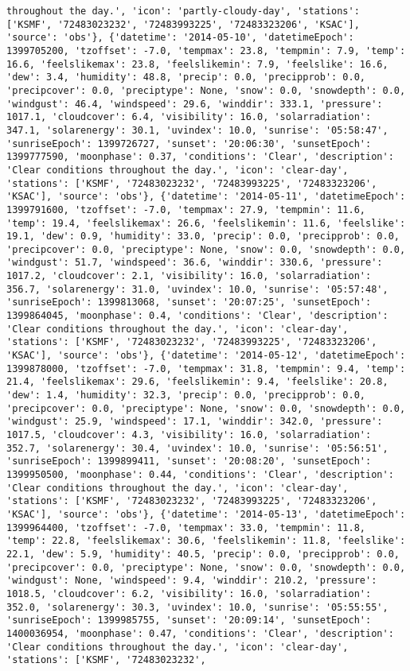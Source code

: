\documentclass[
  letterpaper,
  DIV=11,
  numbers=noendperiod]{scrartcl}
\begin{document}
\begin{verbatim}
throughout the day.', 'icon': 'partly-cloudy-day', 'stations': ['KSMF', '72483023232', '72483993225', '72483323206', 'KSAC'], 'source': 'obs'}, {'datetime': '2014-05-10', 'datetimeEpoch': 1399705200, 'tzoffset': -7.0, 'tempmax': 23.8, 'tempmin': 7.9, 'temp': 16.6, 'feelslikemax': 23.8, 'feelslikemin': 7.9, 'feelslike': 16.6, 'dew': 3.4, 'humidity': 48.8, 'precip': 0.0, 'precipprob': 0.0, 'precipcover': 0.0, 'preciptype': None, 'snow': 0.0, 'snowdepth': 0.0, 'windgust': 46.4, 'windspeed': 29.6, 'winddir': 333.1, 'pressure': 1017.1, 'cloudcover': 6.4, 'visibility': 16.0, 'solarradiation': 347.1, 'solarenergy': 30.1, 'uvindex': 10.0, 'sunrise': '05:58:47', 'sunriseEpoch': 1399726727, 'sunset': '20:06:30', 'sunsetEpoch': 1399777590, 'moonphase': 0.37, 'conditions': 'Clear', 'description': 'Clear conditions throughout the day.', 'icon': 'clear-day', 'stations': ['KSMF', '72483023232', '72483993225', '72483323206', 'KSAC'], 'source': 'obs'}, {'datetime': '2014-05-11', 'datetimeEpoch': 1399791600, 'tzoffset': -7.0, 'tempmax': 27.9, 'tempmin': 11.6, 'temp': 19.4, 'feelslikemax': 26.6, 'feelslikemin': 11.6, 'feelslike': 19.1, 'dew': 0.9, 'humidity': 33.0, 'precip': 0.0, 'precipprob': 0.0, 'precipcover': 0.0, 'preciptype': None, 'snow': 0.0, 'snowdepth': 0.0, 'windgust': 51.7, 'windspeed': 36.6, 'winddir': 330.6, 'pressure': 1017.2, 'cloudcover': 2.1, 'visibility': 16.0, 'solarradiation': 356.7, 'solarenergy': 31.0, 'uvindex': 10.0, 'sunrise': '05:57:48', 'sunriseEpoch': 1399813068, 'sunset': '20:07:25', 'sunsetEpoch': 1399864045, 'moonphase': 0.4, 'conditions': 'Clear', 'description': 'Clear conditions throughout the day.', 'icon': 'clear-day', 'stations': ['KSMF', '72483023232', '72483993225', '72483323206', 'KSAC'], 'source': 'obs'}, {'datetime': '2014-05-12', 'datetimeEpoch': 1399878000, 'tzoffset': -7.0, 'tempmax': 31.8, 'tempmin': 9.4, 'temp': 21.4, 'feelslikemax': 29.6, 'feelslikemin': 9.4, 'feelslike': 20.8, 'dew': 1.4, 'humidity': 32.3, 'precip': 0.0, 'precipprob': 0.0, 'precipcover': 0.0, 'preciptype': None, 'snow': 0.0, 'snowdepth': 0.0, 'windgust': 25.9, 'windspeed': 17.1, 'winddir': 342.0, 'pressure': 1017.5, 'cloudcover': 4.3, 'visibility': 16.0, 'solarradiation': 352.7, 'solarenergy': 30.4, 'uvindex': 10.0, 'sunrise': '05:56:51', 'sunriseEpoch': 1399899411, 'sunset': '20:08:20', 'sunsetEpoch': 1399950500, 'moonphase': 0.44, 'conditions': 'Clear', 'description': 'Clear conditions throughout the day.', 'icon': 'clear-day', 'stations': ['KSMF', '72483023232', '72483993225', '72483323206', 'KSAC'], 'source': 'obs'}, {'datetime': '2014-05-13', 'datetimeEpoch': 1399964400, 'tzoffset': -7.0, 'tempmax': 33.0, 'tempmin': 11.8, 'temp': 22.8, 'feelslikemax': 30.6, 'feelslikemin': 11.8, 'feelslike': 22.1, 'dew': 5.9, 'humidity': 40.5, 'precip': 0.0, 'precipprob': 0.0, 'precipcover': 0.0, 'preciptype': None, 'snow': 0.0, 'snowdepth': 0.0, 'windgust': None, 'windspeed': 9.4, 'winddir': 210.2, 'pressure': 1018.5, 'cloudcover': 6.2, 'visibility': 16.0, 'solarradiation': 352.0, 'solarenergy': 30.3, 'uvindex': 10.0, 'sunrise': '05:55:55', 'sunriseEpoch': 1399985755, 'sunset': '20:09:14', 'sunsetEpoch': 1400036954, 'moonphase': 0.47, 'conditions': 'Clear', 'description': 'Clear conditions throughout the day.', 'icon': 'clear-day', 'stations': ['KSMF', '72483023232', 
\end{verbatim}
\end{document}
